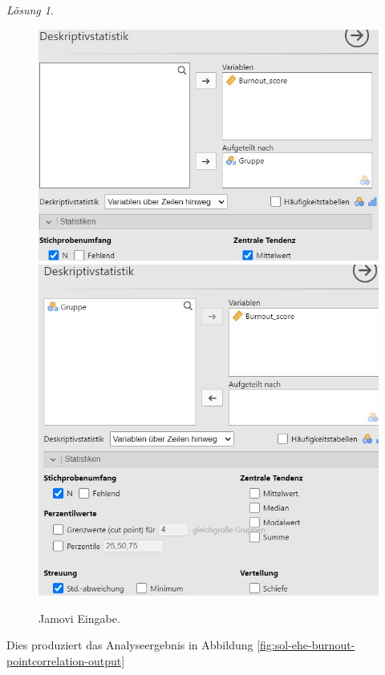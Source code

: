\documentclass[
]{book}
\theoremstyle{definition}
\theoremstyle{definition}
\theoremstyle{definition}
\theoremstyle{definition}
\theoremstyle{remark}
\newtheorem*{solution}{Lösung}
\begin{document}
\begin{solution}
\begin{figure}
\includegraphics[height=0.5\textheight]{figures/08-exr-ehe-burnout-pointcorrelation-jmv-input1} \includegraphics[height=0.5\textheight]{figures/08-exr-ehe-burnout-pointcorrelation-jmv-input2} \caption{Jamovi Eingabe.}\label{fig:sol-ehe-burnout-pointcorrelation-input}
\end{figure}

Dies produziert das Analyseergebnis in Abbildung \ref{fig:sol-ehe-burnout-pointcorrelation-output}


\end{solution}
\end{document}
